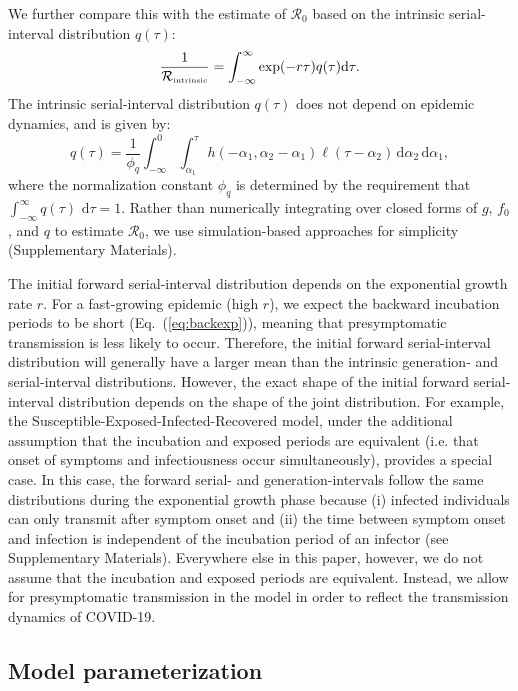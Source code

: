 \documentclass[12pt]{article}
\newcommand{\eref}[1]{Eq.~(\ref{eq:#1})}
\newcommand{\Rx}[1]{\ensuremath{{\mathcal R}_{#1}}\xspace}
\newcommand{\Ro}{\Rx{0}}
\newcommand{\Rintrinsic}{\ensuremath{{\mathcal R}_{\textrm{\tiny intrinsic}}}\xspace}
\newcommand{\dd}[1]{\ensuremath{\, \mathrm{d}#1}}
\newcommand{\dtau}{\dd{\tau}}
\newcommand{\pinf}{\ensuremath{\alpha_1}} %
\newcommand{\sinf}{\ensuremath{\alpha_2}} %
\newcommand{\idist}{\ell} %
\begin{document}
We further compare this with the estimate of \Ro based on the intrinsic serial-interval distribution $q(\tau)$:
\begin{equation}
\frac{1}{\Rintrinsic} = \int_{-\infty}^\infty \exp(-r\tau) q(\tau) \mathrm{d} \tau.
\label{eq:Rintrinsic}
\end{equation}
The intrinsic serial-interval distribution $q(\tau)$ does not depend on epidemic dynamics, and is given by:
\begin{equation}
q(\tau) = \frac{1}{\phi_q} \int_{-\infty}^{0} \int_{\pinf}^{\tau} h(-\pinf, \sinf - \pinf) \idist(\tau - \sinf) \, \mathrm{d}\sinf\,\mathrm{d}\pinf,
\label{eq:intrinsicSI}
\end{equation}
where the normalization constant $\phi_q$ is determined by the
requirement that $\int_{-\infty}^\infty q(\tau)\,\dtau=1$.
Rather than numerically integrating over closed forms of $g$, $f_0$, and $q$ to estimate $\Ro$, we use simulation-based approaches for simplicity (Supplementary Materials).

The initial forward serial-interval distribution depends on the exponential growth rate $r$.
For a fast-growing epidemic (high $r$), we expect the backward incubation periods to be short (\eref{backexp}), meaning that presymptomatic transmission is less likely to occur. 
Therefore, the initial forward serial-interval distribution will generally have a larger mean than the intrinsic generation- and serial-interval distributions.
However, the exact shape of the initial forward serial-interval distribution depends on the shape of the joint distribution.
For example, the Susceptible-Exposed-Infected-Recovered model, under the additional assumption that the incubation and exposed periods are equivalent (i.e. that onset of symptoms and infectiousness occur simultaneously), provides a special case.
In this case, the forward serial- and generation-intervals follow the same distributions during the exponential growth phase because (i) infected individuals can only transmit after symptom onset and (ii) the time between symptom onset and infection is independent of the incubation period of an infector (see Supplementary Materials).
Everywhere else in this paper, however, we do not assume that the incubation and exposed periods are equivalent.
Instead, we allow for presymptomatic transmission in the model in order to reflect the transmission dynamics of COVID-19.

\subsection{Model parameterization}
\end{document}
